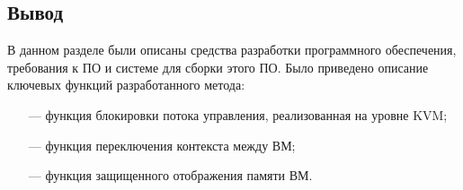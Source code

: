 \subsection*{Вывод}

В данном разделе были описаны средства разработки программного обеспечения, требования к ПО и системе для сборки этого ПО. Было приведено описание ключевых функций разработанного метода:

\begin{itemize}
	\item [---] функция блокировки потока управления, реализованная на уровне KVM;
	\item [---] функция переключения контекста между ВМ;
	\item [---] функция защищенного отображения памяти ВМ.
\end{itemize}

\pagebreak
